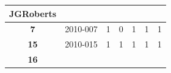 \documentclass[12pt,twoside]{article}
\begin{document}
\begin{longtable}[c]{@{}ccccccc@{}}
\begin{minipage}[b]{0.12\columnwidth}\centering\strut
JGRoberts
\strut\end{minipage}\tabularnewline
\midrule
\endhead
\begin{minipage}[t]{0.10\columnwidth}\centering\strut
\textbf{7}
\strut\end{minipage} &
\begin{minipage}[t]{0.10\columnwidth}\centering\strut
2010-007
\strut\end{minipage} &
\begin{minipage}[t]{0.13\columnwidth}\centering\strut
1
\strut\end{minipage} &
\begin{minipage}[t]{0.11\columnwidth}\centering\strut
0
\strut\end{minipage} &
\begin{minipage}[t]{0.11\columnwidth}\centering\strut
1
\strut\end{minipage} &
\begin{minipage}[t]{0.10\columnwidth}\centering\strut
1
\strut\end{minipage} &
\begin{minipage}[t]{0.12\columnwidth}\centering\strut
1
\strut\end{minipage}\tabularnewline
\begin{minipage}[t]{0.10\columnwidth}\centering\strut
\textbf{15}
\strut\end{minipage} &
\begin{minipage}[t]{0.10\columnwidth}\centering\strut
2010-015
\strut\end{minipage} &
\begin{minipage}[t]{0.13\columnwidth}\centering\strut
1
\strut\end{minipage} &
\begin{minipage}[t]{0.11\columnwidth}\centering\strut
1
\strut\end{minipage} &
\begin{minipage}[t]{0.11\columnwidth}\centering\strut
1
\strut\end{minipage} &
\begin{minipage}[t]{0.10\columnwidth}\centering\strut
1
\strut\end{minipage} &
\begin{minipage}[t]{0.12\columnwidth}\centering\strut
1
\strut\end{minipage}\tabularnewline
\begin{minipage}[t]{0.10\columnwidth}\centering\strut
\textbf{16}
\strut\end{minipage} &

\end{longtable}
\end{document}
